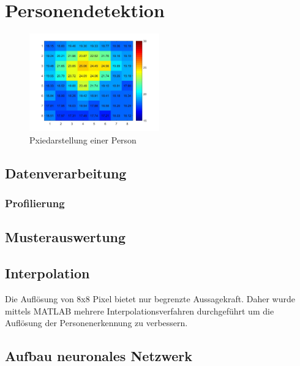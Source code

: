 \chapter{Personendetektion}
\label{chap:Personendetektion}



\begin{figure}[H]
	\centering
	\includegraphics[width=0.5\textwidth]
	{fig/person_175_shirt.jpg}
	\caption[Pixeldarstellung einer Person]{Pxiedarstellung einer Person}
	\label{fig:Pixelbild}
\end{figure}


\section{Datenverarbeitung}

\subsection{Profilierung}





\section{Musterauswertung}



\section{Interpolation}

Die Auflösung von 8x8 Pixel bietet nur begrenzte Aussagekraft. Daher wurde mittels MATLAB mehrere Interpolationsverfahren durchgeführt um die Auflösung der Personenerkennung zu verbessern.





\section{Aufbau neuronales Netzwerk}


